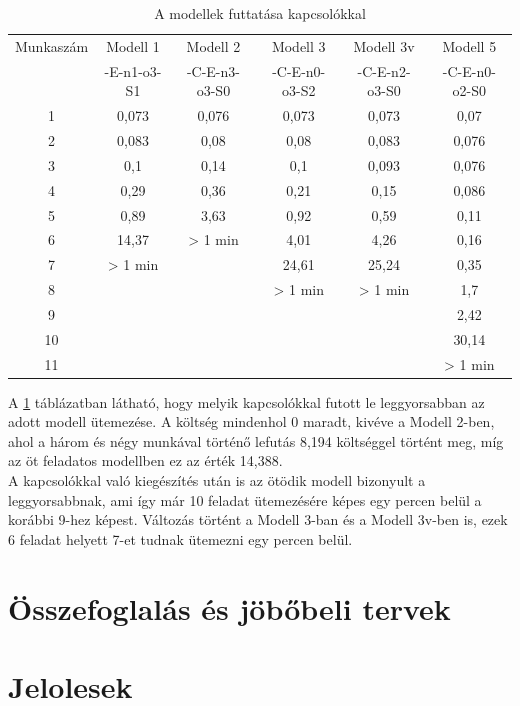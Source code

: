 \documentclass {report}
\begin{document}
   \begin{table}[htpb]
   \label{tab:kapcsolo}
              \centering
              \setlength{\tabcolsep}{1pt}
    	\begin{tabular}{c|c|c|c|c|c}
    	
    	Munkaszám & Modell 1 & Modell 2 & Modell 3 & Modell 3v & Modell 5 \\ 
    	
    	 & -E-n1-o3-S1 & -C-E-n3-o3-S0 & -C-E-n0-o3-S2 & -C-E-n2-o3-S0 & -C-E-n0-o2-S0 \\ 
    	\hline 
    	1 & 0,073 & 0,076 & 0,073 & 0,073 & 0,07 \\ 
     
    	2 & 0,083 & 0,08 & 0,08 & 0,083 & 0,076 \\ 
     
    	3 & 0,1 & 0,14 & 0,1 & 0,093 & 0,076 \\ 
    
    	4 & 0,29 & 0,36 & 0,21 & 0,15 & 0,086 \\ 
    
    	5 & 0,89 & 3,63 & 0,92 & 0,59 & 0,11 \\ 
    
    	6 & 14,37 & > 1 min & 4,01 & 4,26 & 0,16 \\ 
    
    	7 & > 1 min &  & 24,61 & 25,24 & 0,35 \\ 
    
    	8 &  &  & > 1 min & > 1 min & 1,7 \\ 
    
    	9 &  &  &  &  & 2,42 \\ 
    
    	10 &  &  &  &  & 30,14 \\ 
    	11 &  &  &  &  & > 1 min \\ 
    	\end{tabular} 
    	\caption{A modellek futtatása kapcsolókkal}
   \end{table}
    A  \ref{tab:kapcsolo} táblázatban látható, hogy melyik kapcsolókkal futott le leggyorsabban az adott modell ütemezése. A költség mindenhol 0 maradt, kivéve a Modell 2-ben, ahol a három és négy munkával történő lefutás 8,194 költséggel történt meg, míg az öt feladatos modellben ez az érték 14,388.\\
    A kapcsolókkal való kiegészítés után is az ötödik modell bizonyult a leggyorsabbnak, ami így már 10 feladat ütemezésére képes egy percen belül a korábbi 9-hez képest. Változás történt a  Modell 3-ban és a Modell 3v-ben is, ezek 6 feladat helyett 7-et tudnak ütemezni egy percen belül.
   
   
   

\chapter{Összefoglalás és jöbőbeli tervek}


\clearpage
{}



\appendix

\chapter{Jelolesek}
\end{document}
